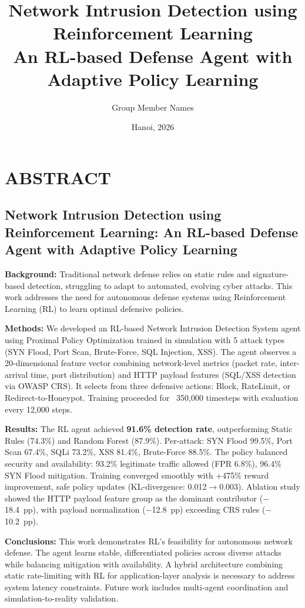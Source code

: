 \documentclass[12pt,a4paper,twoside]{report}
\title{Network Intrusion Detection using Reinforcement Learning\\
An RL-based Defense Agent with Adaptive Policy Learning}
\author{Group Member Names}
\date{Hanoi, 2026}
\begin{document}
\maketitle

\newpage

\chapter*{ABSTRACT}

\section*{Network Intrusion Detection using Reinforcement Learning: An RL-based Defense Agent with Adaptive Policy Learning}

\noindent
\textbf{Background:} Traditional network defense relies on static rules and signature-based detection, struggling to adapt to automated, evolving cyber attacks. This work addresses the need for autonomous defense systems using Reinforcement Learning (RL) to learn optimal defensive policies.

\vspace{0.5cm}
\noindent
\textbf{Methods:} We developed an RL-based Network Intrusion Detection System agent using Proximal Policy Optimization trained in simulation with 5 attack types (SYN Flood, Port Scan, Brute-Force, SQL Injection, XSS). The agent observes a 20-dimensional feature vector combining network-level metrics (packet rate, inter-arrival time, port distribution) and HTTP payload features (SQL/XSS detection via OWASP CRS). It selects from three defensive actions: Block, RateLimit, or Redirect-to-Honeypot. Training proceeded for ~350,000 timesteps with evaluation every 12,000 steps.

\vspace{0.5cm}
\noindent
\textbf{Results:} The RL agent achieved \textbf{91.6\% detection rate}, outperforming Static Rules (74.3\%) and Random Forest (87.9\%). Per-attack: SYN Flood 99.5\%, Port Scan 67.4\%, SQLi 73.2\%, XSS 81.4\%, Brute-Force 88.5\%. The policy balanced security and availability: 93.2\% legitimate traffic allowed (FPR 6.8\%), 96.4\% SYN Flood mitigation. Training converged smoothly with +475\% reward improvement, safe policy updates (KL-divergence: 0.012$\to$0.003). Ablation study showed the HTTP payload feature group as the dominant contributor ($-$18.4~pp), with payload normalization ($-$12.8~pp) exceeding CRS rules ($-$10.2~pp).

\vspace{0.5cm}
\noindent
\textbf{Conclusions:} This work demonstrates RL's feasibility for autonomous network defense. The agent learns stable, differentiated policies across diverse attacks while balancing mitigation with availability. A hybrid architecture combining static rate-limiting with RL for application-layer analysis is necessary to address system latency constraints. Future work includes multi-agent coordination and simulation-to-reality validation.
\end{document}

